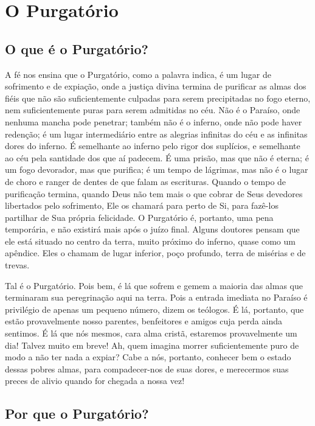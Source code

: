 \renewcommand{\thechapterdisplay}{Segundo dia}
\renewcommand{\thechapterrunner}{O Purgatório}
\chapter[Segundo dia --- O Purgatório]{O Purgatório}
\section*{O que é o Purgatório?}

A fé nos ensina que o Purgatório, como a palavra indica, é um lugar de sofrimento e de expiação, onde a justiça divina termina de purificar as almas dos fiéis que não são suficientemente culpadas para serem precipitadas no fogo eterno, nem
suficientemente puras para serem admitidas no céu. Não é o Paraíso, onde nenhuma mancha pode penetrar; também não é o inferno, onde não pode haver redenção; é um lugar intermediário entre as alegrias infinitas do céu e as infinitas dores do inferno. É semelhante ao inferno pelo rigor dos suplícios, e semelhante ao céu pela santidade dos que aí padecem. É uma prisão, mas que não é eterna; é um fogo devorador, mas que purifica; é um tempo de lágrimas, mas não é o lugar de choro e ranger de dentes de que falam as escrituras. Quando o tempo de purificação termina, quando Deus não tem mais o
que cobrar de Seus devedores libertados pelo sofrimento, Ele os chamará para perto de Si, para fazê-los partilhar de
Sua própria felicidade. O Purgatório é, portanto, uma pena temporária, e não existirá mais após o juízo final. Alguns doutores pensam que ele está situado no centro da terra, muito próximo do inferno, quase como um apêndice. Eles o chamam de lugar inferior, poço profundo, terra de misérias e de trevas.

Tal é o Purgatório. Pois bem, é lá que sofrem e gemem a maioria das almas que terminaram sua peregrinação aqui na terra. Pois a entrada imediata no Paraíso é privilégio de apenas um pequeno número, dizem os teólogos. É lá, portanto, que estão provavelmente nosso parentes, benfeitores e amigos cuja perda ainda sentimos. É lá que nós mesmos, cara alma cristã, estaremos provavelmente um dia! Talvez muito em breve! Ah, quem imagina morrer suficientemente puro de modo a não ter nada a expiar? Cabe a nós, portanto, conhecer bem o estado dessas pobres almas, para compadecer-nos de suas dores, e merecermos suas preces de alivio quando for chegada a nossa vez!


\section*{Por que o Purgatório?}


